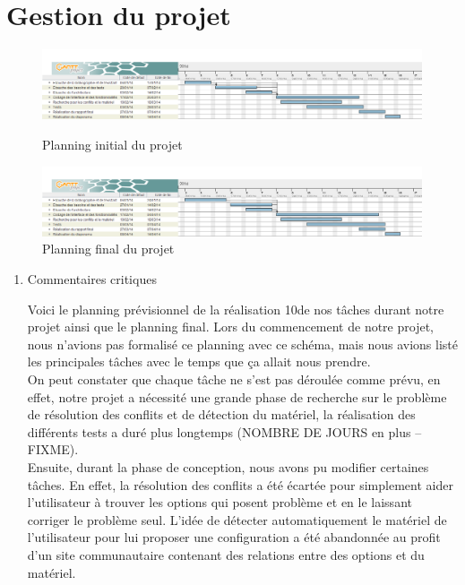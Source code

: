 \documentclass[16pts]{report}
\begin{document}
    \section{Gestion du projet}
    \label{sec:Gestion du projet}

	\begin{figure}
		\includegraphics[scale=0.5]{./illustrations/planning_initial_pdp.png}
		\centering
		\caption{Planning initial du projet}
		\label{fig:PlanningInitial}
		\vspace{10.00mm}
		\includegraphics[scale=0.5]{./illustrations/planning_final_pdp.png}
		\centering
		\caption{Planning final du projet}
		\label{fig:PlanningFinal}
	\end{figure}
	
\newpage
\begin{enumerate}
	\item Commentaires critiques

	Voici le planning prévisionnel de la réalisation 10de nos tâches durant 
	notre projet ainsi que le planning final. Lors du commencement de notre 
	projet, nous n'avions pas formalisé ce planning avec ce schéma, mais nous 
	avions listé les principales tâches avec le temps que ça allait 
	nous prendre.
	\\
	On peut constater que chaque tâche ne s'est pas déroulée comme prévu, 
	en effet, notre projet a nécessité une grande phase de recherche sur le 
	problème de résolution des conflits et de détection du matériel, la 
	réalisation des différents tests a duré plus longtemps 
	(NOMBRE DE JOURS en plus -- FIXME).
	\\
	Ensuite, durant la phase de conception, nous avons pu modifier 
	certaines tâches. En effet, la résolution des conflits a été écartée pour simplement aider l'utilisateur à trouver les options qui posent	problème et en le laissant corriger le problème seul. L'idée de détecter 
	automatiquement le matériel de l'utilisateur pour lui proposer une 
	configuration a été abandonnée au profit d'un site communautaire 
	contenant des relations entre des options et du matériel.



\end{enumerate}
\end{document}
